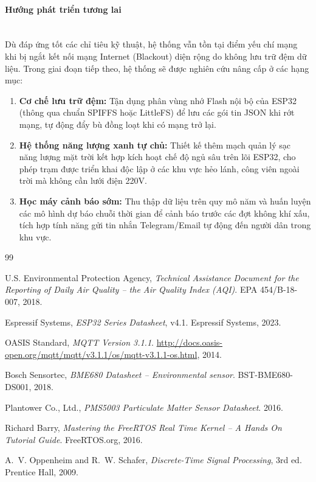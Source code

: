 \documentclass[12pt,a4paper]{article}
\begin{document}
\paragraph*{Hướng phát triển tương lai}\mbox{}\\
Dù đáp ứng tốt các chỉ tiêu kỹ thuật, hệ thống vẫn tồn tại điểm yếu chí mạng khi bị ngắt kết nối mạng Internet (Blackout) diện rộng do không lưu trữ đệm dữ liệu. Trong giai đoạn tiếp theo, hệ thống sẽ được nghiên cứu nâng cấp ở các hạng mục:
\begin{enumerate}
    \item \textbf{Cơ chế lưu trữ đệm:} Tận dụng phân vùng nhớ Flash nội bộ của ESP32 (thông qua chuẩn SPIFFS hoặc LittleFS) để lưu các gói tin JSON khi rớt mạng, tự động đẩy bù đồng loạt khi có mạng trở lại.
    \item \textbf{Hệ thống năng lượng xanh tự chủ:} Thiết kế thêm mạch quản lý sạc năng lượng mặt trời kết hợp kích hoạt chế độ ngủ sâu trên lõi ESP32, cho phép trạm được triển khai độc lập ở các khu vực hẻo lánh, công viên ngoài trời mà không cần lưới điện 220V.
    \item \textbf{Học máy cảnh báo sớm:} Thu thập dữ liệu trên quy mô năm và huấn luyện các mô hình dự báo chuỗi thời gian để cảnh báo trước các đợt không khí xấu, tích hợp tính năng gửi tin nhắn Telegram/Email tự động đến người dân trong khu vực.
\end{enumerate}

\newpage

\newpage
\begin{thebibliography}{99}

U.S. Environmental Protection Agency,
\emph{Technical Assistance Document for the Reporting of Daily Air Quality -- the Air Quality Index (AQI)}.
EPA 454/B-18-007, 2018.

Espressif Systems,
\emph{ESP32 Series Datasheet}, v4.1.
Espressif Systems, 2023.

OASIS Standard,
\emph{MQTT Version 3.1.1}.
\url{http://docs.oasis-open.org/mqtt/mqtt/v3.1.1/os/mqtt-v3.1.1-os.html}, 2014.

Bosch Sensortec,
\emph{BME680 Datasheet -- Environmental sensor}.
BST-BME680-DS001, 2018.

Plantower Co., Ltd.,
\emph{PMS5003 Particulate Matter Sensor Datasheet}.
2016.

Richard Barry,
\emph{Mastering the FreeRTOS Real Time Kernel -- A Hands On Tutorial Guide}.
FreeRTOS.org, 2016.

A.~V. Oppenheim and R.~W. Schafer,
\emph{Discrete-Time Signal Processing}, 3rd ed.
Prentice Hall, 2009.

\end{thebibliography}
\end{document}
